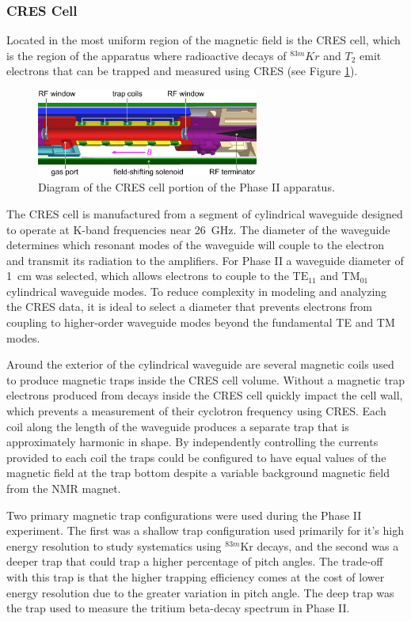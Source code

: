 \subsubsection*{CRES Cell}

Located in the most uniform region of the magnetic field is the CRES cell, which is the region of the apparatus where radioactive decays of $^{83m}Kr$ and $T_2$ emit electrons that can be trapped and measured using CRES (see Figure \ref{fig:chap3-cres-cell}).
\begin{figure}[htbp]
    \centering
    \includegraphics*[width=0.65\textwidth]{figs/Chapter-3/apparatus.pdf}
    \caption{\label{fig:chap3-cres-cell} Diagram of the CRES cell portion of the Phase II apparatus.}
\end{figure}
The CRES cell is manufactured from a segment of cylindrical waveguide designed to operate at K-band frequencies near 26~GHz. The diameter of the waveguide determines which resonant modes of the waveguide will couple to the electron and transmit its radiation to the amplifiers. For Phase II a waveguide diameter of 1~cm was selected, which allows electrons to couple to the $\mathrm{TE}_{11}$ and $\mathrm{TM}_{01}$ cylindrical waveguide modes. To reduce complexity in modeling and analyzing the CRES data, it is ideal to select a diameter that prevents electrons from coupling to higher-order waveguide modes beyond the fundamental TE and TM modes. 

Around the exterior of the cylindrical waveguide are several magnetic coils used to produce magnetic traps inside the CRES cell volume. Without a magnetic trap electrons produced from decays inside the CRES cell quickly impact the cell wall, which prevents a measurement of their cyclotron frequency using CRES. Each coil along the length of the waveguide produces a separate trap that is approximately harmonic in shape. By independently controlling the currents provided to each coil the traps could be configured to have equal values of the magnetic field at the trap bottom despite a variable background magnetic field from the NMR magnet. 

Two primary magnetic trap configurations were used during the Phase II experiment. The first was a shallow trap configuration used primarily for it's high energy resolution to study systematics using $^{83m}$Kr decays, and the second was a deeper trap that could trap a higher percentage of pitch angles. The trade-off with this trap is that the higher trapping efficiency comes at the cost of lower energy resolution due to the greater variation in pitch angle. The deep trap was the trap used to measure the tritium beta-decay spectrum in Phase II.

